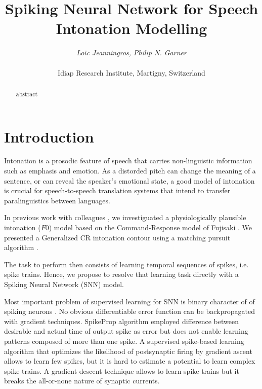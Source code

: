 \documentclass[letterpaper, 10 pt, conference]{ieeeconf}  %
\title{\LARGE \bf
Spiking Neural Network for Speech Intonation Modelling
}
\author{\textit{Lo\"ic Jeanningros, Philip N. Garner} \\
\\
Idiap Research Institute, Martigny, Switzerland%
}
\begin{document}
\maketitle
\thispagestyle{empty}
\pagestyle{empty}


\begin{abstract}

abstract

\end{abstract}


\section{Introduction}
Intonation is a prosodic feature of speech that carries non-linguistic information such as emphasis and emotion. As a distorded pitch can change the meaning of a sentence, or can reveal the speaker's emotional state, a good model of intonation is crucial for speech-to-speech translation systems that intend to transfer paralinguistics between languages.

In previous work with colleagues \cite{honnet2015atom}, we investiguated a physiologically plausible intonation ($F0$) model based on the Command-Response model of Fujisaki \cite{fujisaki1998command}. We presented a Generalized CR intonation contour using a matching pursuit algorithm \cite{mallat1993matching}. 

The task to perform then consists of learning temporal sequences of spikes, i.e. spike trains. Hence, we propose to resolve that learning task directly with a Spiking Neural Network (SNN) model.


Most important problem of supervised learning for SNN is binary character of of spiking neurons \cite{gavrilov2016methods}. No obvious differentiable error function can be backpropagated with gradient techniques. 
SpikeProp algorithm \cite{bohte2002error} employed difference between desirable and actual time of output spike as error but does not enable learning patterns composed of more than one spike. 
A supervised spike-based learning algorithm \cite{pfister2006optimal} that optimizes the likelihood of postsynaptic firing by gradient ascent allows to learn few spikes, but it is hard to estimate a potential to learn complex spike trains.
A gradient descent technique \cite{huh2018gradient} allows to learn spike trains but it breaks the all-or-none nature of synaptic currents.
\end{document}
